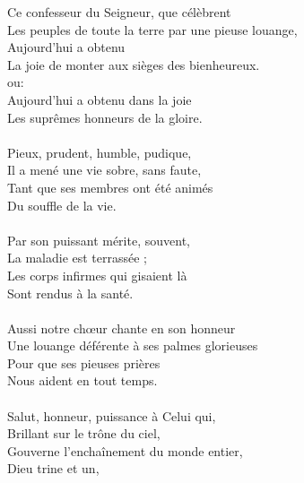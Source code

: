 Ce confesseur du Seigneur, que célèbrent\\
Les peuples de toute la terre par une pieuse louange,\\
Aujourd’hui a obtenu\\
La joie de monter aux sièges des bienheureux.\\
ou:\\
Aujourd’hui a obtenu dans la joie\\
Les suprêmes honneurs de la gloire.\\
\\
Pieux, prudent, humble, pudique,\\
Il a mené une vie sobre, sans faute,\\
Tant que ses membres ont été animés\\
Du souffle de la vie.\\
\\
Par son puissant mérite, souvent,\\
La maladie est terrassée ;\\
Les corps infirmes qui gisaient là\\
Sont rendus à la santé.\\
\\
Aussi notre chœur chante en son honneur \\
Une louange déférente à ses palmes glorieuses\\
Pour que ses pieuses prières\\
Nous aident en tout temps.\\
\\
Salut, honneur, puissance à Celui qui,\\
Brillant sur le trône du ciel,\\
Gouverne l’enchaînement du monde entier,\\
Dieu trine et un, 